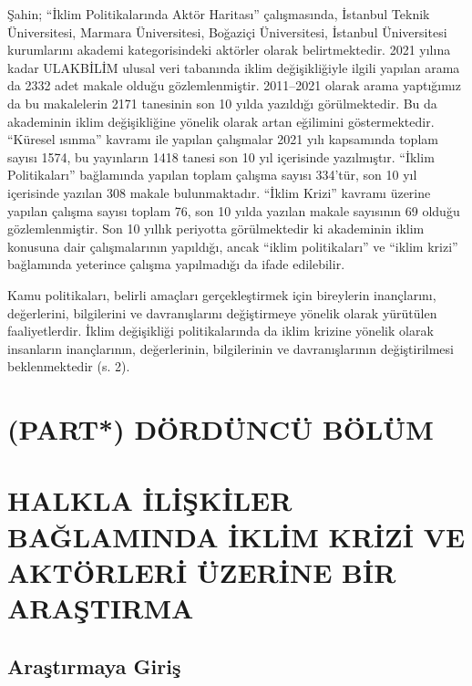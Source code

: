 \documentclass[
]{book}
\begin{document}
Şahin; ``İklim Politikalarında Aktör Haritası'' çalışmasında, İstanbul Teknik Üniversitesi, Marmara Üniversitesi, Boğaziçi Üniversitesi, İstanbul Üniversitesi kurumlarını akademi kategorisindeki aktörler olarak belirtmektedir. 2021 yılına kadar ULAKBİLİM ulusal veri tabanında iklim değişikliğiyle ilgili yapılan arama da 2332 adet makale olduğu gözlemlenmiştir. 2011--2021 olarak arama yaptığımız da bu makalelerin 2171 tanesinin son 10 yılda yazıldığı görülmektedir. Bu da akademinin iklim değişikliğine yönelik olarak artan eğilimini göstermektedir. ``Küresel ısınma'' kavramı ile yapılan çalışmalar 2021 yılı kapsamında toplam sayısı 1574, bu yayınların 1418 tanesi son 10 yıl içerisinde yazılmıştır. ``İklim Politikaları'' bağlamında yapılan toplam çalışma sayısı 334'tür, son 10 yıl içerisinde yazılan 308 makale bulunmaktadır. ``İklim Krizi'' kavramı üzerine yapılan çalışma sayısı toplam 76, son 10 yılda yazılan makale sayısının 69 olduğu gözlemlenmiştir. Son 10 yıllık periyotta görülmektedir ki akademinin iklim konusuna dair çalışmalarının yapıldığı, ancak ``iklim politikaları'' ve ``iklim krizi'' bağlamında yeterince çalışma yapılmadığı da ifade edilebilir.

Kamu politikaları, belirli amaçları gerçekleştirmek için bireylerin inançlarını, değerlerini, bilgilerini ve davranışlarını değiştirmeye yönelik olarak yürütülen faaliyetlerdir. İklim değişikliği politikalarında da iklim krizine yönelik olarak insanların inançlarının, değerlerinin, bilgilerinin ve davranışlarının değiştirilmesi beklenmektedir (s. 2). \citep{demirci2016islevsel}

\hypertarget{part-duxf6rduxfcncuxfc-buxf6luxfcm}{%
\chapter*{\texorpdfstring{(PART*) \textbf{DÖRDÜNCÜ BÖLÜM}}{(PART*) DÖRDÜNCÜ BÖLÜM}}\label{part-duxf6rduxfcncuxfc-buxf6luxfcm}}

\hypertarget{halkla-iliux15fkiler-baux11flaminda-iklim-krizi-ve-aktuxf6rleri-uxfczerine-bir-araux15ftirma}{%
\chapter{HALKLA İLİŞKİLER BAĞLAMINDA İKLİM KRİZİ VE AKTÖRLERİ ÜZERİNE BİR ARAŞTIRMA}\label{halkla-iliux15fkiler-baux11flaminda-iklim-krizi-ve-aktuxf6rleri-uxfczerine-bir-araux15ftirma}}

\hypertarget{araux15ftux131rmaya-giriux15f}{%
\section{Araştırmaya Giriş}\label{araux15ftux131rmaya-giriux15f}}
\end{document}
